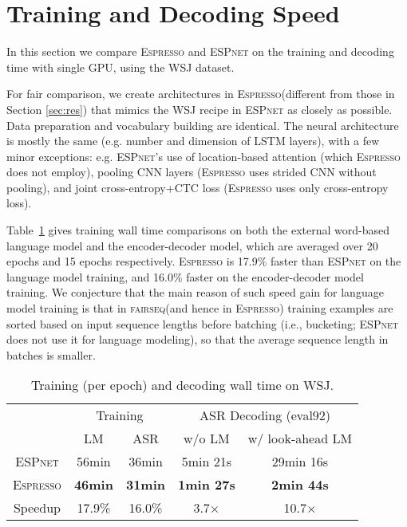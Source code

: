 \documentclass{article}
\def\espresso{\textsc{Espresso}\xspace}
\def\fairseq{\textsc{fairseq}\xspace}
\def\espnet{\textsc{ESPnet}\xspace}
\begin{document}
\section{Training and Decoding Speed}

In this section we compare \espresso and \espnet on the training and decoding time with single GPU, using the WSJ dataset. 

For fair comparison, we create architectures in \espresso (different from those in Section \ref{sec:res}) that mimics the WSJ recipe in \espnet as closely as possible. Data preparation and vocabulary building are identical. The neural architecture is mostly the same (e.g. number and dimension of LSTM layers), with a few minor exceptions: e.g. \espnet's use of location-based attention (which \espresso does not employ),  pooling CNN layers (\espresso uses strided CNN without pooling), and joint cross-entropy+CTC loss (\espresso uses only cross-entropy loss).

Table~\ref{tab:train_speed} gives training wall time comparisons on both the external word-based language model and the encoder-decoder model, which are averaged over 20 epochs and 15 epochs respectively. \espresso is 17.9\% faster than \espnet on the language model training, and 16.0\% faster on the encoder-decoder model training. We conjecture that the main reason of such speed gain for language model training is that in \fairseq (and hence in \espresso) training examples are sorted based on input sequence lengths before batching (i.e., bucketing; \espnet does not use it for language modeling), so that the average sequence length in batches is smaller.

\begin{table}[tb]
  \caption{Training (per epoch) and decoding wall time on WSJ.}
  \label{tab:train_speed}
  \centering
  \begin{adjustbox}{max width=\linewidth}
  \begin{tabular}{c c c c c}
    \toprule
    & \multicolumn{2}{c}{Training} & \multicolumn{2}{c}{ASR Decoding (eval92)} \\
    \cmidrule(lr){2-3} \cmidrule(lr){4-5} 
    & LM & ASR & w/o LM & w/ look-ahead LM \\
    \midrule
    \espnet & 56min & 36min & 5min 21s & 29min 16s \\ \espresso & \textbf{46min} & \textbf{31min} & \bf 1min 27s & \bf 2min 44s \\
    \midrule
    Speedup & 17.9\% & 16.0\% & 3.7$\times$ & 10.7$\times$ \\
    \bottomrule
  \end{tabular}
  \end{adjustbox}
\end{table}
\end{document}
